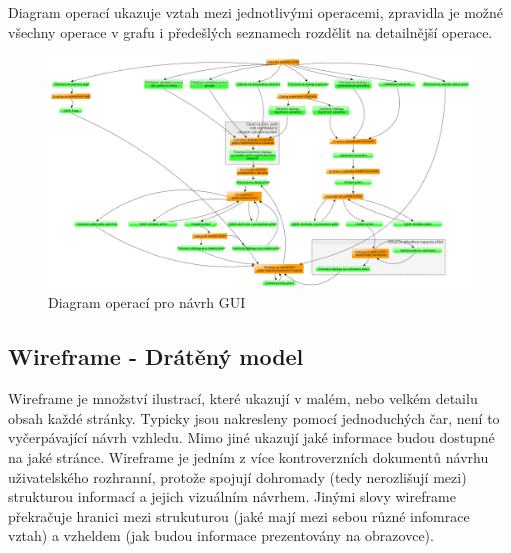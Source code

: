Diagram operací ukazuje vztah mezi jednotlivými operacemi, zpravidla je možné všechny operace v grafu i předešlých seznamech rozdělit na detailnější operace.

\begin{figure}[htb]
\begin{center}
\includegraphics[width=150mm]{./pictures/taskGraph.png}
\caption{Diagram operací pro návrh GUI}
\label{fig:taskGraph}
\end{center}
\end{figure}

\subsection{Wireframe - Drátěný model}
Wireframe je množství ilustrací, které ukazují v malém, nebo velkém detailu obsah každé stránky. Typicky jsou nakresleny pomocí jednoduchých čar, není to vyčerpávající návrh vzhledu. Mimo jiné ukazují jaké informace budou dostupné na jaké stránce. Wireframe je jedním z více kontroverzních dokumentů návrhu uživatelského rozhranní, protože spojují dohromady (tedy nerozlišují mezi) strukturou informací a jejich vizuálním návrhem. Jinými slovy wireframe překračuje hranici mezi strukuturou (jaké mají mezi sebou různé infomrace vztah) a vzheldem (jak budou informace prezentovány na obrazovce)\cite{brown2007communicating}.